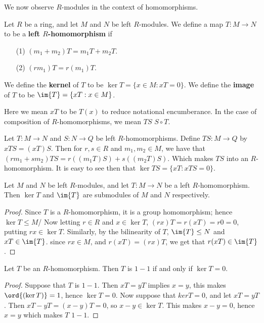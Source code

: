 We now observe $R$-modules in the context of homomorphisms.

\begin{definition}
    Let $R$ be a ring, and let  $M$ and  $N$ be  left $R$-modules. We define a map  $T:M \rightarrow
    N$to be a \textbf{left $R$-homomorphism} if
        \begin{enumerate}
            \item[(1)] $(m_1+m_2)T=m_1T+m_2T$.

            \item[(2)] $(rm_1)T=r(m_1)T$.
        \end{enumerate}
    We define the \textbf{kernel} of $T$ to be  $\ker{T}=\{x \in M: xT=0\}$. We define the
    \textbf{image} of $T$ to be  $\im{T}=\{xT: x \in M\}$.
\end{definition}

Here we mean $xT$ to be  $T(x)$ to reduce notational encumberance. In the case of composition of
$R$-homomorphisms, we mean  $TS$  $S \circ T$.

\begin{example}
    Let $T:M \rightarrow N$ and $S:N \rightarrow Q$ be left $R$-homomorphisms. Define  $TS:M
    \rightarrow Q$ by $xTS=(xT)S$. Then for $r, s \in R$ and  $m_1, m_2 \in M$, we have that
    $(rm_1+sm_2)TS=r((m_1T)S)+s((m_2T)S)$. Which makes $TS$ into an $R$-homomorphism. It is easy to
    see then that  $\ker{TS}=\{xT:xTS=0\}$.
\end{example} 

\begin{lemma}
    Let $M$ and  $N$ be left  $R$-modules, and let  $T:M \rightarrow N$ be a left $R$-homomorphism.
    Then  $\ker{T}$ and $\im{T}$ are submodules of $M$ and  $N$ respectively.
\end{lemma}
\begin{proof}
    Since $T$ is a  $R$-homomorphism, it is a group homomorphism; hence  $\ker{T} \leq M$/ Now
    letting $r \in R$ and  $x \in \ker{T}$, $(rx)T=r(xT)=r0=0$, putting $rx \in \ker{T}$. 
    Similarly, by the bilinearity of $T$,  $\im{T} \leq N$ and $xT \in \im{T}$. since $rx \in M$,  
    and $r(xT)=(rx)T$, we get that $r(xT) \in \im{T}$.
\end{proof}

\begin{lemma}
    Let $T$ be an $R$-homomorphism. Then  $T$ is  $1-1$ if and only if  $\ker{T}=0$.
\end{lemma}
\begin{proof}
    Suppose that $T$ is  $1-1$. Then  $xT=yT$ implies  $x=y$, this makes  $\ord{(\ker{T})}=1$, hence
    $\ker{T}=0$. Now suppose that $ker{T}=0$, and let $xT=yT$. Then  $xT-yT=(x-y)T=0$, so $x-y \in
    \ker{T}$. This makes $x-y=0$, hence  $x=y$ which makes  $T$  $1-1$.
\end{proof}

